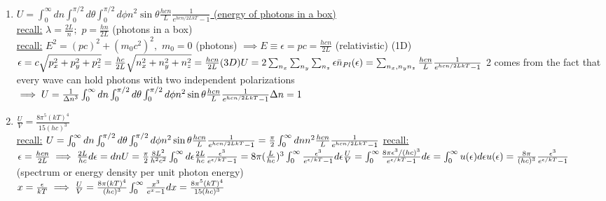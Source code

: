 \documentclass[12pt]{amsart}
\begin{document}
\begin{enumerate}
\item \underline{$U = \int_0^{\infty} dn \int_0^{\pi/2} d \theta \int_0^{\pi/2} d \phi n^2 \sin \theta \frac{h c n}{L} \frac{1}{e^{hcn/2LkT} -1}$ (energy of photons in a box)}\\
\underline{recall:} $\lambda = \frac{2L}{n};\,\, p = \frac{hn}{2L}$ (photons in a box)\\
\underline{recall:} $E^2=(pc)^2+(m_0 c^2)^2,\,\, m_0=0$ (photons) $\implies E \equiv \epsilon = pc = \frac{hcn}{2L}$ (relativistic) (1D)\\
$\epsilon= c \sqrt{p_x^2 + p_y^2 + p_z^2} = \frac{hc}{2L} \sqrt{n_x^2 + n_y^2 + n_z^2} = \frac{hcn}{2L} (3D)\\
U = 2 \sum_{n_x} \sum_{n_y} \sum_{n_z} \epsilon \bar{n}_{Pl} ( \epsilon) = \sum_{n_x,n_yn_z} \frac{hcn}{L} \frac{1}{e^{hcn/2LkT} -1}\\$
2 comes from the fact that every wave can hold photons with two independent polarizations\\
$\implies U= \frac{1}{\Delta n^3} \int_0^{\infty} dn \int_0^{\pi/2} d \theta \int_0^{\pi/2} d \phi n^2 \sin \theta \frac{hcn}{L} \frac{1}{e^{hcn/2LkT}-1}\\
\Delta n= 1\\$\\


\hdashrule[0.5ex][c]{\linewidth}{0.5pt}{1.5mm}


\item \underline{$\frac{U}{V} = \frac{8 \pi^5 (kT)^4}{15(hc)^3}$}\\
\underline{recall:} $U = \int_0^{\infty} dn \int_0^{\pi/2} d \theta \int_0^{\pi/2} d \phi n^2 \sin \theta \frac{hcn}{L} \frac{1}{e^{hcn/2LkT}-1}=\frac{\pi}{2} \int_0^{\infty} dn n^2 \frac{hcn}{L} \frac{1}{e^{hcn/2LkT}-1}\\$
\underline{recall:} $\epsilon=\frac{hcn}{2L} \implies \frac{2L}{hc} d \epsilon = dn\\
U = \frac{\pi}{2} \frac{8 L^2}{h^2 c^2} \int_0^{\infty} d \epsilon \frac{2L}{hc} \frac{\epsilon^3}{e^{\epsilon/kT} -1}\\
= 8 \pi (\frac{L}{hc})^3 \int_0^{\infty} \frac{\epsilon^3}{e^{\epsilon/kT} -1} d \epsilon\\
\frac{U}{V} = \int_0^{\infty} \frac{8 \pi \epsilon^3/(hc)^3}{e^{\epsilon/kT}-1} d \epsilon = \int_0^{\infty} u(\epsilon) d \epsilon \\
u(\epsilon) = \frac{8 \pi}{(hc)^3} \frac{\epsilon^3}{e^{\epsilon/kT}-1}$(spectrum or energy density per unit photon energy)\\
$x=\frac{\epsilon}{kT}\\
\implies \frac{U}{V} = \frac{8 \pi (kT)^4}{(hc)^3} \int_0^{\infty} \frac{x^3}{e^x-1} dx = \frac{8 \pi^5(kT)^4}{15 (hc)^3}\\$



\end{enumerate}
\end{document}

